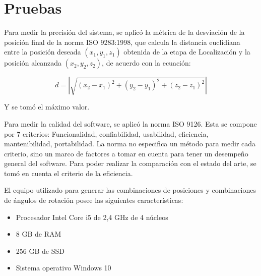 \section{Pruebas}

Para medir la precisión del sistema, se aplicó la métrica de la desviación de la posición final de la norma ISO 9283:1998, que calcula la distancia euclidiana entre la posición deseada $(x_1, y_1, z_1)$ obtenida de la etapa de Localización y la posición alcanzada $(x_2, y_2, z_2)$, de acuerdo con la ecuación:

\begin{equation}
	d = |\sqrt{(x_2 - x_1)^2 + (y_2 - y_1)^2 + (z_2 - z_1)^2}|
\end{equation}

Y se tomó el máximo valor.

Para medir la calidad del software, se aplicó la norma ISO 9126. Esta se compone por 7 criterios: Funcionalidad, confiabilidad, usabilidad, eficiencia, mantenibilidad, portabilidad. La norma no especifica un método para medir cada criterio, sino un marco de factores a tomar en cuenta para tener un desempeño general del software. Para poder realizar la comparación con el estado del arte, se tomó en cuenta el criterio de la eficiencia.

El equipo utilizado para generar las combinaciones de posiciones y combinaciones de ángulos de rotación posee las siguientes características:

\begin{itemize}
	\item Procesador Intel Core i5 de 2,4 GHz de 4 núcleos
	\item 8 GB de RAM
	\item 256 GB de SSD
	\item Sistema operativo Windows 10
\end{itemize}